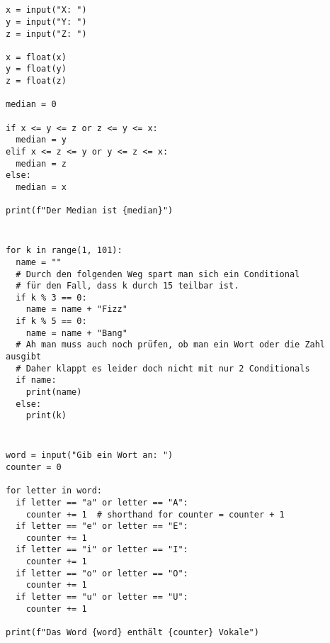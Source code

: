 \documentclass[a4paper]{article}
\begin{document}




\section{}
\begin{verbatim}
x = input("X: ")
y = input("Y: ")
z = input("Z: ")

x = float(x)
y = float(y)
z = float(z)

median = 0

if x <= y <= z or z <= y <= x:
  median = y
elif x <= z <= y or y <= z <= x:
  median = z
else:
  median = x

print(f"Der Median ist {median}")
\end{verbatim}

\section{}
\begin{verbatim}
for k in range(1, 101):
  name = ""
  # Durch den folgenden Weg spart man sich ein Conditional
  # für den Fall, dass k durch 15 teilbar ist.
  if k % 3 == 0:
    name = name + "Fizz"
  if k % 5 == 0:
    name = name + "Bang"
  # Ah man muss auch noch prüfen, ob man ein Wort oder die Zahl ausgibt
  # Daher klappt es leider doch nicht mit nur 2 Conditionals
  if name:
    print(name)
  else:
    print(k)
\end{verbatim}

\newpage

\section{} 
\begin{verbatim}
word = input("Gib ein Wort an: ")
counter = 0

for letter in word:
  if letter == "a" or letter == "A":
    counter += 1  # shorthand for counter = counter + 1
  if letter == "e" or letter == "E":
    counter += 1
  if letter == "i" or letter == "I":
    counter += 1
  if letter == "o" or letter == "O":
    counter += 1
  if letter == "u" or letter == "U":
    counter += 1

print(f"Das Word {word} enthält {counter} Vokale")
\end{verbatim}
\begin{verbatim}

\end{verbatim}
\end{document}
